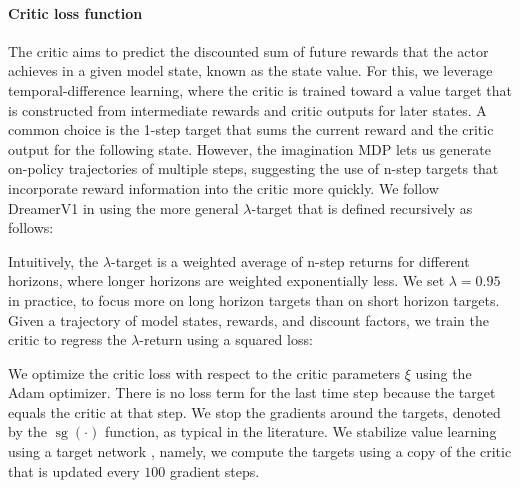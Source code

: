 \paragraph{Critic loss function}

The critic aims to predict the discounted sum of future rewards that the actor achieves in a given model state, known as the state value. For this, we leverage temporal-difference learning, where the critic is trained toward a value target that is constructed from intermediate rewards and critic outputs for later states. A common choice is the 1-step target that sums the current reward and the critic output for the following state. However, the imagination MDP lets us generate on-policy trajectories of multiple steps, suggesting the use of n-step targets that incorporate reward information into the critic more quickly. We follow DreamerV1 in using the more general $\lambda$-target \citep{sutton2018rlbook,schulman2015gae} that is defined recursively as follows:


Intuitively, the $\lambda$-target is a weighted average of n-step returns for different horizons, where longer horizons are weighted exponentially less. We set $\lambda=0.95$ in practice, to focus more on long horizon targets than on short horizon targets. Given a trajectory of model states, rewards, and discount factors, we train the critic to regress the $\lambda$-return using a squared loss:


We optimize the critic loss with respect to the critic parameters $\xi$ using the Adam optimizer. There is no loss term for the last time step because the target equals the critic at that step. We stop the gradients around the targets, denoted by the $\operatorname{sg}(\cdot)$ function, as typical in the literature. We stabilize value learning using a target network \citep{mnih2015dqn}, namely, we compute the targets using a copy of the critic that is updated every $100$ gradient steps.

